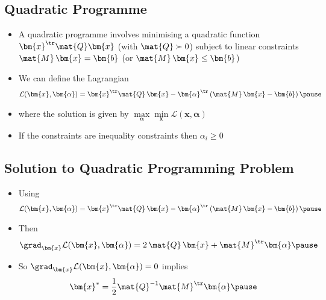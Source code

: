 
\begin{slide}
\section[-2]{Quadratic Programme}

\begin{PauseHighLight}
  \begin{itemize}
  \item A quadratic programme involves minimising a quadratic function
    $\bm{x}^\tr \mat{Q} \bm{x}$ (with $\mat{Q}\succ 0$) subject to
    linear constraints $\mat{M}\,\bm{x} = \bm{b}$ (or
    $\mat{M}\,\bm{x} \leq \bm{b}$)\pause
  \item We can define the Lagrangian
    \begin{align*}
      \mathcal{L}(\bm{x},\bm{\alpha}) = \bm{x}^\tr \mat{Q}\, \bm{x} -
      \bm{\alpha}^\tr \left( \mat{M}\,\bm{x} - \bm{b}\right)\pause
    \end{align*}
  \item where the solution is given by $\max\limits_{\bm{\alpha}}
    \min\limits_{\bm{x}}  \mathcal{L}(\bm{x},\bm{\alpha})$\pause
  \item If the constraints are inequality constraints then
    $\alpha_i\geq0$\pause
  \end{itemize}
\end{PauseHighLight}

\end{slide}


\begin{slide}
\section{Solution to Quadratic Programming Problem}

\begin{PauseHighLight}
  \begin{itemize}
  \item Using
    \begin{align*}
      \mathcal{L}(\bm{x},\bm{\alpha}) = \bm{x}^\tr \mat{Q}\, \bm{x} -
      \bm{\alpha}^\tr \left( \mat{M}\,\bm{x} - \bm{b}\right)\pause
    \end{align*}
  \item Then
    \begin{align*}
      \grad_{\bm{x}} \mathcal{L}(\bm{x},\bm{\alpha}) =  2\, \mat{Q}\,
      \bm{x} + \mat{M}^\tr \bm{\alpha}\pause
    \end{align*}
  \item So $\grad_{\bm{x}} \mathcal{L}(\bm{x},\bm{\alpha}) = 0$
    implies
    \begin{align*}
      \bm{x}^* = \frac{1}{2} \mat{Q}^{-1} \mat{M}^\tr \bm{\alpha}\pause
    \end{align*}
  \end{itemize}
\end{PauseHighLight}

\end{slide}

